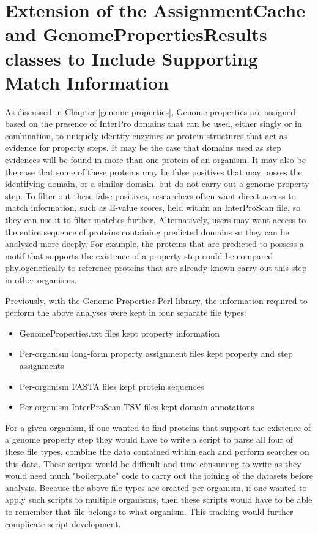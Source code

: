 \section{Extension of the AssignmentCache and GenomePropertiesResults classes to Include Supporting Match Information}

As discussed in Chapter \ref{genome-properties}, Genome properties are assigned based on the presence of InterPro domains that can be used, either singly or in combination, to uniquely identify enzymes or protein structures that act as evidence for property steps. It may be the case that domains used as step evidences will be found in more than one protein of an organism. It may also be the case that some of these proteins may be false positives that may posses the identifying domain, or a similar domain, but do not carry out a genome property step. To filter out these false positives, researchers often want direct access to match information, such as E-value scores, held within an InterProScan file, so they can use it to filter matches further. Alternatively, users may want access to the entire sequence of proteins containing predicted domains so they can be analyzed more deeply. For example, the proteins that are predicted to possess a motif that supports the existence of a property step could be compared phylogenetically to reference proteins that are already known carry out this step in other organisms. 

Previously, with the Genome Properties Perl library, the information required to perform the above analyses were kept in four separate file types:

\begin{itemize}
\item GenomeProperties.txt files kept property information
\item Per-organism long-form property assignment files kept property and step assignments
\item Per-organism FASTA files \cite{pearson19905} kept protein sequences 
\item  Per-organism InterProScan TSV files kept domain annotations 
\end{itemize}

For a given organism, if one wanted to find proteins that support the existence of a genome property step they would have to write a script to parse all four of these file types, combine the data contained within each and perform searches on this data. These scripts would be difficult and time-consuming to write as they would need much "boilerplate" code to carry out the joining of the datasets before analysis. Because the above file types are created per-organism, if one wanted to apply such scripts to multiple organisms, then these scripts would have to be able to remember that file belongs to what organism. This tracking would further complicate script development.

